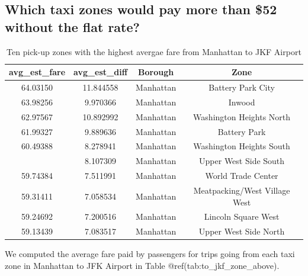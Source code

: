 \documentclass[12pt,twoside]{reedthesis}
\theoremstyle{definition}
\theoremstyle{definition}
\theoremstyle{definition}
\theoremstyle{remark}
\begin{document}
\subsection{Which taxi zones would pay more than \$52 without the flat
rate?}\label{which-taxi-zones-would-pay-more-than-52-without-the-flat-rate}
\begin{table}

\caption{\label{tab:unnamed-chunk-88}Ten pick-up zones with the highest avergae fare from Manhattan to JKF Airport}
\centering
\begin{tabular}[t]{cccc}
\toprule
avg\_est\_fare & avg\_est\_diff & Borough & Zone\\
\midrule
64.03150 & 11.844558 & Manhattan & Battery Park City\\
63.98256 & 9.970366 & Manhattan & Inwood\\
62.97567 & 10.892992 & Manhattan & Washington Heights North\\
61.99327 & 9.889636 & Manhattan & Battery Park\\
60.49388 & 8.278941 & Manhattan & Washington Heights South\\
\addlinespace
60.18006 & 8.107309 & Manhattan & Upper West Side South\\
59.74384 & 7.511991 & Manhattan & World Trade Center\\
59.31411 & 7.058534 & Manhattan & Meatpacking/West Village West\\
59.24692 & 7.200516 & Manhattan & Lincoln Square West\\
59.13439 & 7.083517 & Manhattan & Upper West Side North\\
\bottomrule
\end{tabular}
\end{table}
We computed the average fare paid by passengers for trips going from
each taxi zone in Manhattan to JFK Airport in Table
@ref(tab:to\_jkf\_zone\_above).
\end{document}
